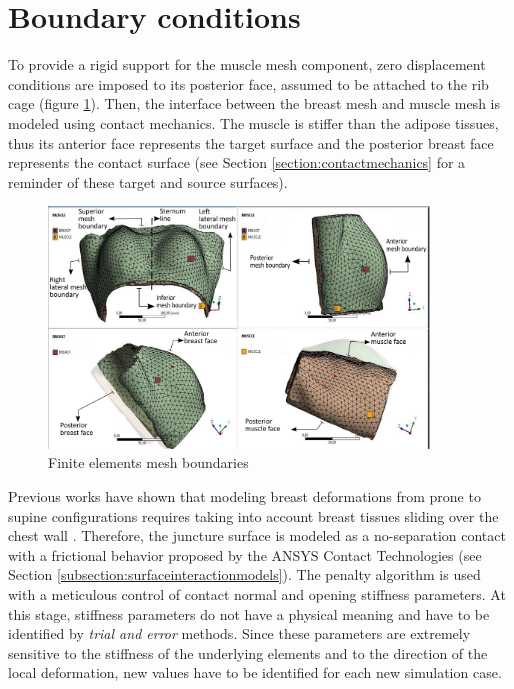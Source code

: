 \section{Boundary conditions}\label{section:myBoundayconditions}
To provide a rigid support for the muscle mesh component, zero displacement conditions are imposed to its posterior face, assumed to be attached to the rib cage (figure \ref{fig:meshboundaries}). Then, the interface between the breast mesh and muscle mesh is modeled using contact mechanics. The muscle is stiffer than the adipose tissues, thus its anterior face represents the target surface and the posterior breast face represents the contact surface (see Section \ref{section:contactmechanics} for a reminder of these target and source surfaces). 

\begin{figure}[!h]
\centering
\includegraphics[width=0.9\textwidth,keepaspectratio]{figures/mesh_parts_2.png} 
\caption{Finite elements mesh boundaries}\label{fig:meshboundaries}
\end{figure}

Previous works have shown that modeling breast deformations from prone to supine configurations requires taking into account breast tissues sliding over the chest wall \citep{carter_application_2012,han_nonlinear_2014}.  Therefore, the juncture surface is modeled as a no-separation contact with a frictional behavior proposed by the ANSYS Contact Technologies (see Section \ref{subsection:surfaceinteractionmodels}). The penalty algorithm is used with a meticulous control of contact normal and opening stiffness parameters. At this stage, stiffness parameters do not have a physical meaning and have to be identified by \textit{trial and error} methods. Since these parameters are extremely sensitive to the stiffness of the underlying elements and to the direction of the local deformation, new values have to be identified for each new simulation case.    


